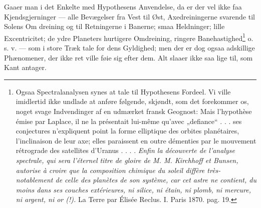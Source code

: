 \documentclass[12pt,a4paper]{book}
\begin{document}
Gaaer man i det Enkelte med Hypothesens Anvendelse, da er der vel ikke
faa Kjendsgjerninger --- alle Bevægelser fra Vest til Øst,
Axedreiningerne svarende til Solens Om\-%
dreining og til Retningerne i Banerne; smaa Heldninger; lille
Excentricitet; de ydre Planeters hurtigere Omdreining, ringere
Banehastighed\footnote{%
Ogsaa Spectralanalysen synes at tale til Hypothesens Fordeel. Vi ville
imidlertid ikke undlade at anføre følgende, skjøndt, som det forekommer
os, noget svage Indvendinger af en udmærket fransk Geognost: Mais
l'hypothèse émise par Laplace, il ne la présentait lui-même qu'avec
„defiance“ . . . ses conjectures n'expliquent point la forme elliptique
des orbites planétaires, l'inclinaison de leur axe; elles paraissent en
outre démenties par le mouvement rétrograde des satellites d'Uranus
. . . . \textit{Enfin la découverte de l'analyse spectrale, qui sera
l'éternel titre de gloire de M. M. Kirchhoff et Bunsen, autorise à
croire que la composition chimique du soleil diffère
très-notablement de celle des planètes de son système, car cet astre ne
contient, du moins dans ses couches extérieures, ni silice, ni étain, ni
plomb, ni mercure, ni argent, ni or (!).} La Terre par Élisée Reclus.
I. Paris 1870. pag. 19.}
o. s. v. --- som i store Træk tale for dens Gyldighed; men der er dog
ogsaa adskillige Phænomener, der ikke ret ville føie sig efter
dem. Alt slaaer ikke saa lige til, som Kant antager.
\end{document}
